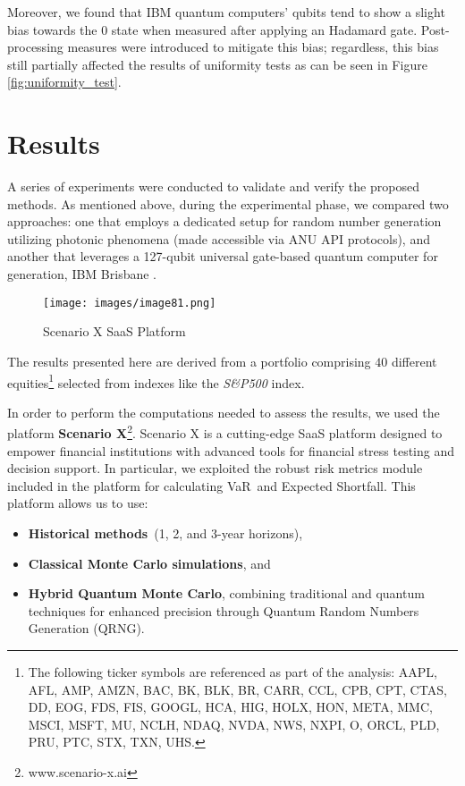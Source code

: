 \documentclass{article}
\begin{document}
Moreover, we found that IBM quantum computers' qubits tend to show a slight bias towards the 0 state when measured after applying an Hadamard gate. Post-processing measures were introduced to mitigate this bias; regardless, this bias still partially affected the results of uniformity tests as can be seen in Figure \ref{fig:uniformity_test}.



\section{Results}
A series of experiments were conducted to validate and verify the proposed methods. 
As mentioned above, during the experimental phase, we compared two approaches: one that employs a dedicated setup for random number generation utilizing photonic phenomena (made accessible via ANU API protocols), and another that leverages a 127-qubit universal gate-based quantum computer for generation, IBM Brisbane \cite{ibm_brisbane}.

\begin{figure}
    \centering
    \texttt{[image: images/image81.png]}
    \caption{Scenario X SaaS Platform}
    \label{fig:platform}
\end{figure}

The results presented here are derived from a portfolio comprising $40$ different equities\footnote{The following ticker symbols are referenced as part of the analysis: AAPL, AFL, AMP, AMZN, BAC, BK, BLK, BR, CARR, CCL, CPB, CPT, CTAS, DD, EOG, FDS, FIS, GOOGL, HCA, HIG, HOLX, HON, META, MMC, MSCI, MSFT, MU, NCLH, NDAQ, NVDA, NWS, NXPI, O, ORCL, PLD, PRU, PTC, STX, TXN, UHS.} selected from indexes like the \textit{S\&P500} index. 

In order to perform the computations needed to assess the results, we used the platform \textbf{Scenario X}\footnote{www.scenario-x.ai}.
Scenario X is a cutting-edge SaaS platform designed to empower financial institutions with advanced tools for financial stress testing and decision support.
In particular, we exploited the robust risk metrics module included in the platform for calculating VaR and Expected Shortfall. This platform allows us to use:

\begin{itemize}
    \item \textbf{Historical methods} (1, 2, and 3-year horizons),
    \item \textbf{Classical Monte Carlo simulations}, and
    \item \textbf{Hybrid Quantum Monte Carlo}, combining traditional and quantum techniques for enhanced precision through Quantum Random Numbers Generation (QRNG).
\end{itemize}
\end{document}
